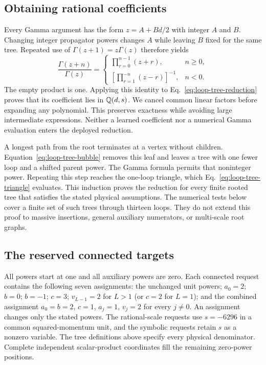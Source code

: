 \subsection{Obtaining rational coefficients}
Every Gamma argument has the form $z=A+Bd/2$ with integer $A$ and $B$. Changing integer propagator powers changes $A$ while leaving $B$ fixed for the same tree. Repeated use of $\Gamma(z+1)=z\Gamma(z)$ therefore yields
\begin{equation}
 \frac{\Gamma(z+n)}{\Gamma(z)}=
 \begin{cases}
 \prod_{r=0}^{n-1}(z+r),&n\ge0,\\
 \displaystyle\left[\prod_{r=1}^{-n}(z-r)\right]^{-1},&n<0.
 \end{cases}
 \label{eq:loop-tree-shift}
\end{equation}
The empty product is one. Applying this identity to Eq.~\eqref{eq:loop-tree-reduction} proves that its coefficient lies in $\mathbb Q(d,s)$. We cancel common linear factors before expanding any polynomial. This preserves exactness while avoiding large intermediate expressions. Neither a learned coefficient nor a numerical Gamma evaluation enters the deployed reduction.

A longest path from the root terminates at a vertex without children. Equation~\eqref{eq:loop-tree-bubble} removes this leaf and leaves a tree with one fewer loop and a shifted parent power. The Gamma formula permits that noninteger power. Repeating this step reaches the one-loop triangle, which Eq.~\eqref{eq:loop-tree-triangle} evaluates. This induction proves the reduction for every finite rooted tree that satisfies the stated physical assumptions. The numerical tests below cover a finite set of such trees through thirteen loops. They do not extend this proof to massive insertions, general auxiliary numerators, or multi-scale root graphs.

\subsection{The reserved connected targets}
All powers start at one and all auxiliary powers are zero. Each connected request contains the following seven assignments: the unchanged unit powers; $a_0=2$; $b=0$; $b=-1$; $c=3$; $v_{L-1}=2$ for $L>1$ (or $c=2$ for $L=1$); and the combined assignment $a_0=b=2$, $c=1$, $a_j=1$, $v_j=2$ for every $j\ne0$. An assignment changes only the stated powers. The rational-scale requests use $s=-6296$ in a common squared-momentum unit, and the symbolic requests retain $s$ as a nonzero variable. The tree definitions above specify every physical denominator. Complete independent scalar-product coordinates fill the remaining zero-power positions.

